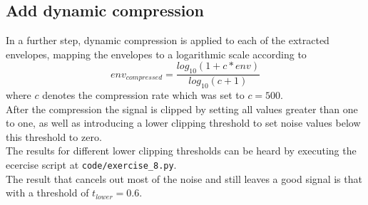 \documentclass{scrartcl}			%
\begin{document}
\subsection{Add dynamic compression}
In a further step, dynamic compression is applied to each of the extracted envelopes, mapping the envelopes to a logarithmic scale according to
\begin{equation}
env_{compressed}=\frac{log_{10}(1+c*env)}{log_{10}(c+1)}
\end{equation}
where $c$ denotes the compression rate which was set to $c=500$.\\
After the compression the signal is clipped by setting all values greater than one to one, as well as introducing a lower clipping threshold to set noise values below this threshold to zero.\\ 
The results for different lower clipping thresholds can be heard by executing the ecercise script at \texttt{code/exercise\_8.py}.\\ The result that cancels out most of the noise and still leaves a good signal is that with a threshold of $t_{lower}=0.6$. 
\end{document}
